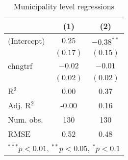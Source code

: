 
\begin{table}
\caption{Municipality level regressions}
\begin{center}
\begin{tabular}{l c c }
\hline
 & (1) & (2) \\
\hline
(Intercept) & $0.25$   & $-0.38^{**}$ \\
            & $(0.17)$ & $(0.15)$     \\
chngtrf     & $-0.02$  & $-0.01$      \\
            & $(0.02)$ & $(0.02)$     \\
\hline
R$^2$       & 0.00     & 0.37         \\
Adj. R$^2$  & -0.00    & 0.16         \\
Num. obs.   & 130      & 130          \\
RMSE        & 0.52     & 0.48         \\
\hline
\multicolumn{3}{l}{\scriptsize{$^{***}p<0.01$, $^{**}p<0.05$, $^*p<0.1$}}
\end{tabular}
\label{table:coefficients}
\end{center}
\end{table}
